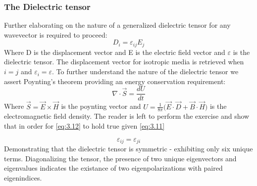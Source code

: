 \subsubsection{The Dielectric tensor}
Further elaborating on the nature of a generalized dielectric tensor for any wavevector is required to proceed:
\begin{equation}\label{eq:3.11}
D_i = \varepsilon_{ij}E_j
\end{equation}
Where D is the displacement vector and E is the electric field vector and $\varepsilon$ is the dielectric tensor. The displacement vector for isotropic media is retrieved when $i = j$ and $\varepsilon_i = \varepsilon$. To further understand the nature of the dielectric tensor we assert Poynting's theorem providing an energy conservation requirement:
\begin{equation}\label{eq:3.12}
\nabla \cdot \vec{S} = \frac{dU}{dt}
\end{equation}
Where $\vec{S} = \vec{E} \times \vec{H}$ is the poynting vector and $U = \frac{1}{8 \pi} \big( \vec{E} \cdot \vec{D} + \vec{B} \cdot \vec{H} \big)$ is the electromagnetic field density. The reader is left to perform the exercise and show that in order for \ref{eq:3.12} to hold true given \ref{eq:3.11}


\begin{equation}
\varepsilon_{ij} = \varepsilon_{ji}
\end{equation}
Demonstrating that the dielectric tensor is symmetric - exhibiting only six unique terms. Diagonalizing the tensor, the presence of two unique eigenvectors and eigenvalues indicates the existance of two eigenpolarizations with paired eigenindices.

